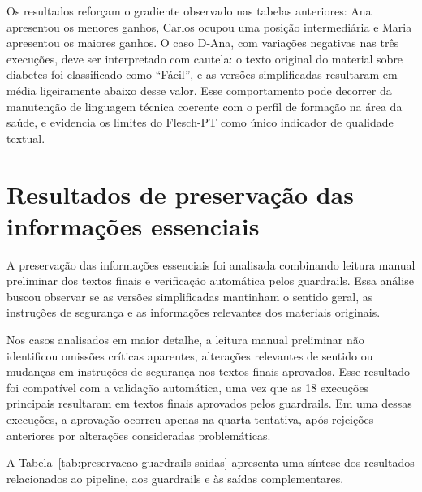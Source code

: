 Os resultados reforçam o gradiente observado nas tabelas anteriores: Ana apresentou os menores ganhos, Carlos ocupou uma posição intermediária e Maria apresentou os maiores ganhos. O caso D-Ana, com variações negativas nas três execuções, deve ser interpretado com cautela: o texto original do material sobre diabetes foi classificado como ``Fácil'', e as versões simplificadas resultaram em média ligeiramente abaixo desse valor. Esse comportamento pode decorrer da manutenção de linguagem técnica coerente com o perfil de formação na área da saúde, e evidencia os limites do Flesch-PT como único indicador de qualidade textual.

\section{Resultados de preservação das informações essenciais}
\label{sec:resultados-preservacao-informacoes-essenciais}

A preservação das informações essenciais foi analisada combinando leitura manual preliminar dos textos finais e verificação automática pelos guardrails. Essa análise buscou observar se as versões simplificadas mantinham o sentido geral, as instruções de segurança e as informações relevantes dos materiais originais.

Nos casos analisados em maior detalhe, a leitura manual preliminar não identificou omissões críticas aparentes, alterações relevantes de sentido ou mudanças em instruções de segurança nos textos finais aprovados. Esse resultado foi compatível com a validação automática, uma vez que as 18 execuções principais resultaram em textos finais aprovados pelos guardrails. Em uma dessas execuções, a aprovação ocorreu apenas na quarta tentativa, após rejeições anteriores por alterações consideradas problemáticas.

A Tabela~\ref{tab:preservacao-guardrails-saidas} apresenta uma síntese dos resultados relacionados ao pipeline, aos guardrails e às saídas complementares.

